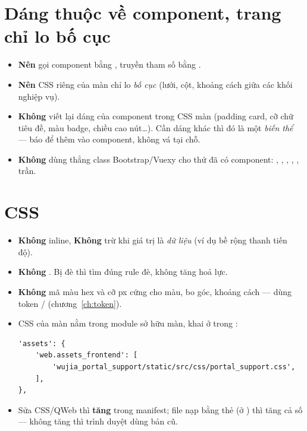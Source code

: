 \documentclass[11pt,a4paper]{report}
\newcommand{\codesp}[1]{\texttt{\detokenize{#1}}}
\newcommand{\ok}{\textcolor{okgreen}{\textbf{Nên}}}
\newcommand{\no}{\textcolor{badred}{\textbf{Không}}}
\begin{document}
\section{Dáng thuộc về component, trang chỉ lo bố cục}
\begin{itemize}
  \item \ok{} gọi component bằng , truyền tham số bằng .
  \item \ok{} CSS riêng của màn chỉ lo \emph{bố cục} (lưới, cột, khoảng cách giữa các khối nghiệp vụ).
  \item \no{} viết lại dáng của component trong CSS màn (padding card, cỡ chữ tiêu đề, màu badge, chiều cao nút\ldots).
        Cần dáng khác thì đó là một \emph{biến thể} --- báo để thêm vào component, không vá tại chỗ.
  \item \no{} dùng thẳng class Bootstrap/Vuexy cho thứ đã có component:
        , \codesp{btn btn-primary}, , , ,  trần.
\end{itemize}

\section{CSS}
\begin{itemize}
  \item \no{}  inline, \no{}  trừ khi giá trị là \emph{dữ liệu} (ví dụ bề rộng thanh tiến độ).
  \item \no{} . Bị đè thì tìm đúng rule đè, không tăng hoả lực.
  \item \no{} mã màu hex và cỡ px cứng cho màu, bo góc, khoảng cách --- dùng token  /  (chương~\ref{ch:token}).
  \item CSS của màn nằm trong module sở hữu màn, khai ở  trong :
\begin{Verbatim}[frame=single,framesep=4pt,rulecolor=\color{black!20},fontsize=\small,xleftmargin=6pt]
'assets': {
    'web.assets_frontend': [
        'wujia_portal_support/static/src/css/portal_support.css',
    ],
},
\end{Verbatim}
  \item Sửa CSS/QWeb thì \textbf{tăng } trong manifest; file nạp bằng thẻ \codesp{<link ...?v=N>}
        (ở ) thì tăng cả số  --- không tăng thì trình duyệt dùng bản cũ.
\end{itemize}
\end{document}
